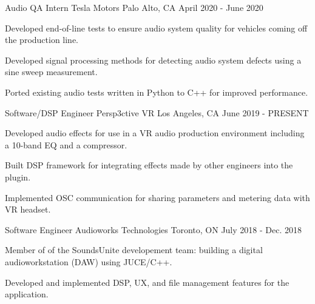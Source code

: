 

\begin{cventries}

    \cventry
    {Audio QA Intern} %
    {Tesla Motors} %
    {Palo Alto, CA} %
    {April 2020 - June 2020} %
    {
      \begin{cvitems} %
        \item{Developed end-of-line tests to ensure audio system quality for vehicles coming off the production line.}
        \item {Developed signal processing methods for detecting audio system defects using a sine sweep measurement.}
        \item {Ported existing audio tests written in Python to C++ for improved performance.}
      \end{cvitems}
    }

    \cventry
    {Software/DSP Engineer} %
    {Persp3ctive VR} %
    {Los Angeles, CA} %
    {June 2019 - PRESENT} %
    {
      \begin{cvitems} %
        \item {Developed audio effects for use in a VR audio production environment
               including a 10-band EQ and a compressor.}
        \item {Built DSP framework for integrating effects made by other engineers into the plugin.}
        \item {Implemented OSC communication for sharing parameters and metering data with VR headset.}
      \end{cvitems}
    }

    \cventry
    {Software Engineer} %
    {Audioworks Technologies} %
    {Toronto, ON} %
    {July 2018 - Dec. 2018} %
    {
      \begin{cvitems} %
        \item {Member of of the SoundsUnite developement team: building a digital audioworkstation (DAW) using JUCE/C++.}
        \item {Developed and implemented DSP, UX, and file management features for the application.}
      \end{cvitems}
    }


\end{cventries}
